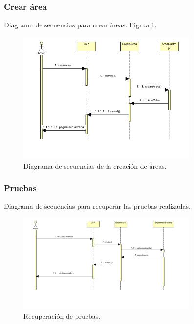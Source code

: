 \subsubsection{Crear área}
Diagrama de secuencias para crear áreas. Figrua \ref{creacionarea}.
\begin{figure}[!htbp]
  \centering
    \includegraphics[width=0.8\textwidth]{../img/diagramas/secuencias/6.jpg}
  \caption{Diagrama de secuencias de la creación de áreas.}
  \label{creacionarea}
\end{figure}

\subsubsection{Pruebas}
Diagrama de secuencias para recuperar las pruebas realizadas.
\begin{figure}[!htbp]
  \centering
    \includegraphics[width=0.8\textwidth]{../img/diagramas/secuencias/11.jpg}
  \caption{Recuperación de pruebas.}
  \label{recprueba}
\end{figure}

